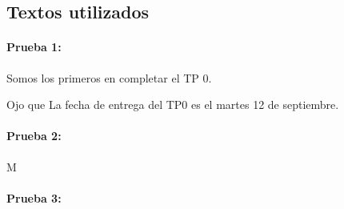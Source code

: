 \documentclass[a4paper]{article}
\begin{document}
\pagebreak
\subsection{Textos utilizados}

\paragraph{Prueba 1:}

Somos los primeros en completar el TP 0.

Ojo que La fecha de entrega del TP0 es el martes 12 de septiembre.

\paragraph{Prueba 2:}

M

\paragraph{Prueba 3:} 
\end{document}
